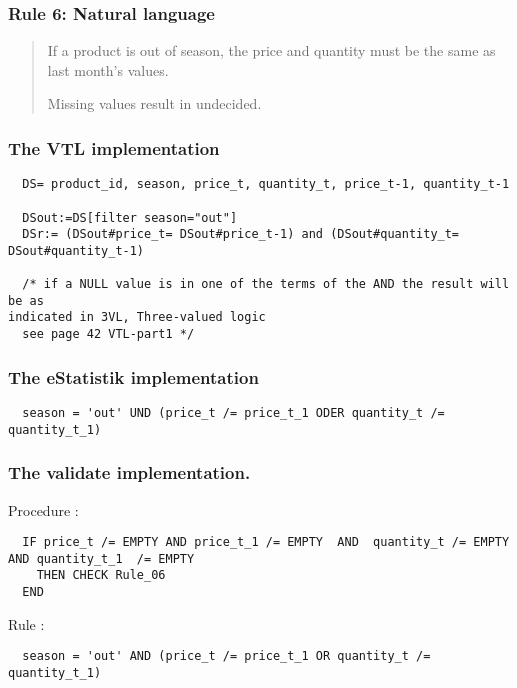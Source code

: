 \newpage

\subsubsection*{  Rule 6: Natural language}
\begin{quote}


If a product is out of season, the price and quantity must be the same as last month's values.

Missing values result in undecided.


\end{quote}
\subsubsection*{The VTL implementation}
\begin{verbatim}
  DS= product_id, season, price_t, quantity_t, price_t-1, quantity_t-1

  DSout:=DS[filter season="out"]
  DSr:= (DSout#price_t= DSout#price_t-1) and (DSout#quantity_t=
DSout#quantity_t-1)

  /* if a NULL value is in one of the terms of the AND the result will be as
indicated in 3VL, Three-valued logic
  see page 42 VTL-part1 */
\end{verbatim}

\subsubsection*{The eStatistik implementation}
\begin{verbatim}
  season = 'out' UND (price_t /= price_t_1 ODER quantity_t /= quantity_t_1)
\end{verbatim}

\subsubsection*{The validate implementation.}
\noindent
Procedure :
\begin{verbatim}
  IF price_t /= EMPTY AND price_t_1 /= EMPTY  AND  quantity_t /= EMPTY   AND quantity_t_1  /= EMPTY 
    THEN CHECK Rule_06
  END
\end{verbatim}
\noindent
Rule :
\begin{verbatim}
  season = 'out' AND (price_t /= price_t_1 OR quantity_t /= quantity_t_1)
  \end{verbatim}


\newpage

